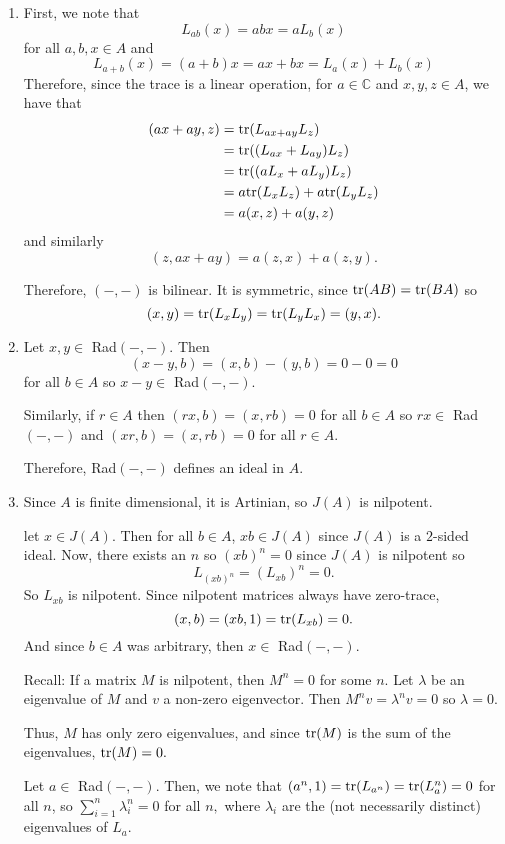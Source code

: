 \documentclass[12pt]{AlgebraQual}
\begin{document}
\begin{solution}$\,$
\begin{enumerate}[label=(\alph*)]
    \item First, we note that $$L_{ab}(x)=abx=aL_b(x)$$ for all $a,b,x\in A$ and $$L_{a+b}(x)=(a+b)x=ax+bx=L_a(x)+L_b(x)$$ Therefore, since the trace is a linear operation, for $a\in\mathbb{C}$ and $x,y,z\in A$, we have that \begin{align*}
        (ax+ay,z)&=\text{tr}(L_{ax+ay}L_z)\\
        &=\text{tr}((L_{ax}+L_{ay})L_z)\\
        &=\text{tr}((aL_x+aL_y)L_z)\\
        &=a\text{tr}(L_xL_z)+a\text{tr}(L_yL_z)\\
        &=a(x,z)+a(y,z)
    \end{align*} and similarly $$(z,ax+ay)=a(z,x)+a(z,y).$$

    Therefore, $(-,-)$ is bilinear. It is symmetric, since $\text{tr}(AB)=\text{tr}(BA)$ so $$(x,y)=\text{tr}(L_xL_y)=\text{tr}(L_yL_x)=(y,x).$$
    \item Let $x,y\in $ Rad$(-,-)$. Then $$(x-y,b)=(x,b)-(y,b)=0-0=0$$ for all $b\in A$ so $x-y\in $ Rad$(-,-)$.

    Similarly, if $r\in A$ then $(rx,b)=(x,rb)=0$ for all $b\in A$ so $rx\in $ Rad$(-,-)$ and $(xr,b)=(x,rb)=0$ for all $r\in A$.

    Therefore, Rad$(-,-)$ defines an ideal in $A$.

    \item Since $A$ is finite dimensional, it is Artinian, so $J(A)$ is nilpotent.

    let $x\in J(A)$. Then for all $b\in A$, $xb\in J(A)$ since $J(A)$ is a $2$-sided ideal. Now, there exists an $n$ so $(xb)^n=0$ since $J(A)$ is nilpotent so $$L_{(xb)^n}=(L_{xb})^n=0.$$ So $L_{xb}$ is nilpotent. Since nilpotent matrices always have zero-trace, $$(x,b)=(xb,1)=\text{tr}(L_{xb})=0.$$ And since $b\in A$ was arbitrary, then $x\in $ Rad$(-,-)$.

    \begin{mybox}
    Recall: If a matrix $M$ is nilpotent, then $M^n=0$ for some $n$. Let $\lambda$ be an eigenvalue of $M$ and $v$ a non-zero eigenvector. Then $M^nv=\lambda^nv=0$ so $\lambda=0$.

    Thus, $M$ has only zero eigenvalues, and since $\text{tr}(M)$ is the sum of the eigenvalues, $\text{tr}(M)=0.$
    \end{mybox}

    Let $a\in$ Rad$(-,-)$. Then, we note that $(a^n,1)=\text{tr}(L_{a^n})=\text{tr}(L_a^n)=0$ for all $n$, so $\sum_{i=1}^n\lambda_i^n=0$ for all $n,$ where $\lambda_i$ are the (not necessarily distinct) eigenvalues of $L_a$.


\end{enumerate}
\end{solution}
\end{document}
